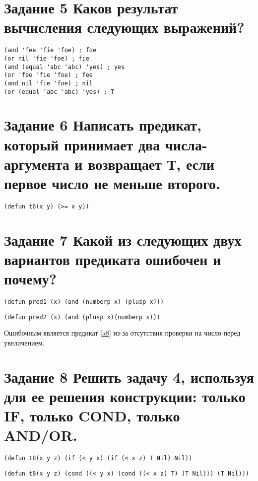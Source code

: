 \section{Задание 5 Каков результат вычисления следующих выражений?}
\begin{center}
	\begin{lstlisting}[label=a5, caption={Выражение 5}]
(and 'fee 'fie 'foe) ; foe
(or nil 'fie 'foe) ; fie
(and (equal 'abc 'abc) 'yes) ; yes
(or 'fee 'fie 'foe) ; fee
(and nil 'fie 'foe) ; nil
(or (equal 'abc 'abc) 'yes) ; T
	\end{lstlisting}
\end{center}

\section{Задание 6  Написать предикат, который принимает два числа-аргумента и возвращает
	Т, если первое число не меньше второго.}
\begin{center}
	\begin{lstlisting}[label=a6, caption={Выражение 6}]
(defun t6(x y) (>= x y))
	\end{lstlisting}
\end{center}

\section{Задание 7 Какой из следующих двух вариантов предиката ошибочен и почему?}
\begin{center}
	\begin{lstlisting}[label=a7, caption={Выражение 7}]
(defun pred1 (x) (and (numberp x) (plusp x)))
	\end{lstlisting}
\begin{lstlisting}[label=a8, caption={Выражение 8}]
(defun pred2 (x) (and (plusp x)(numberp x)))
\end{lstlisting}
\end{center}

Ошибочным является предикат \ref{a8} из-за отсутствия проверки на число перед увеличением. 

\section{Задание 8 Решить задачу 4, используя для ее решения конструкции:
	только IF, только COND, только AND/OR.}
\begin{center}
	\begin{lstlisting}[label=a9, caption={Выражение 9}]
(defun t8(x y z) (if (< y x) (if (< x z) T Nil) Nil))
	\end{lstlisting}
	\begin{lstlisting}[label=a10, caption={Выражение 10}]
(defun t8(x y z) (cond ((< y x) (cond ((< x z) T) (T Nil))) (T Nil)))
\end{lstlisting}
\end{center}

